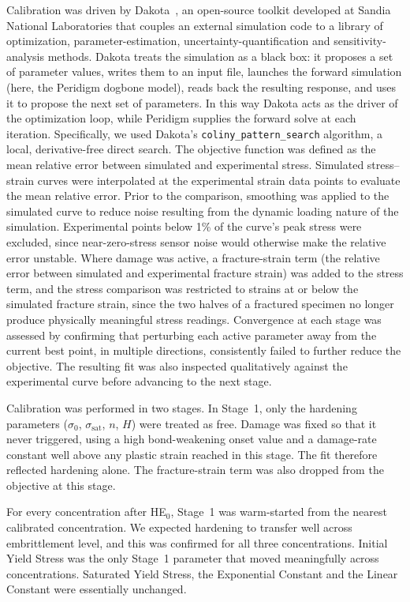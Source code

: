 \documentclass[pdflatex,sn-mathphys-num]{sn-jnl}%
\theoremstyle{thmstyleone}%
\theoremstyle{thmstyletwo}%
\theoremstyle{thmstylethree}%
\begin{document}
Calibration was driven by Dakota~\cite{dakota2025}, an open-source toolkit developed at Sandia
National Laboratories that couples an external simulation code to a library of optimization,
parameter-estimation, uncertainty-quantification and sensitivity-analysis methods. Dakota treats the
simulation as a black box: it proposes a set of parameter values, writes them to an input file,
launches the forward simulation (here, the Peridigm dogbone model), reads back the resulting response,
and uses it to propose the next set of parameters. In this way Dakota acts as the driver of the
optimization loop, while Peridigm supplies the forward solve at each iteration. Specifically, we used
Dakota's \texttt{coliny\_pattern\_search} algorithm, a local, derivative-free direct search. The objective function was defined as the mean relative error between simulated and experimental stress.
Simulated stress--strain curves were interpolated at the experimental strain data points to evaluate the mean relative error.  Prior to the comparison, smoothing was applied to the simulated curve to reduce noise resulting from the dynamic loading nature of the simulation. Experimental points below 1\% of the curve's peak stress were
excluded, since near-zero-stress sensor noise would otherwise make the relative error unstable. Where damage was active, a
fracture-strain term (the relative error between simulated and experimental fracture strain) was
added to the stress term, and the stress comparison was restricted to strains at or below the
simulated fracture strain, since the two halves of a fractured specimen no longer produce physically
meaningful stress readings. Convergence at each stage was assessed by confirming that perturbing
each active parameter away from the current best point, in multiple directions, consistently failed
to further reduce the objective.  The resulting fit was also inspected qualitatively against the
experimental curve before advancing to the next stage.

Calibration was performed in two stages. In Stage~1, only the hardening parameters
($\sigma_0$, $\sigma_{\mathrm{sat}}$, $n$, $H$) were treated as free. Damage was fixed so that it never triggered, using a high bond-weakening onset value and a damage-rate constant well above any plastic strain reached in this stage. The fit therefore reflected hardening alone. The fracture-strain
term was also dropped from the objective at this stage.

For every concentration after HE$_{0}$, Stage~1 was warm-started from the nearest calibrated
concentration. We expected hardening to transfer well across embrittlement level, and this was
confirmed for all three concentrations. Initial Yield Stress was the only Stage~1 parameter that moved
meaningfully across concentrations. Saturated Yield Stress, the Exponential Constant and the Linear
Constant were essentially unchanged.
\end{document}
